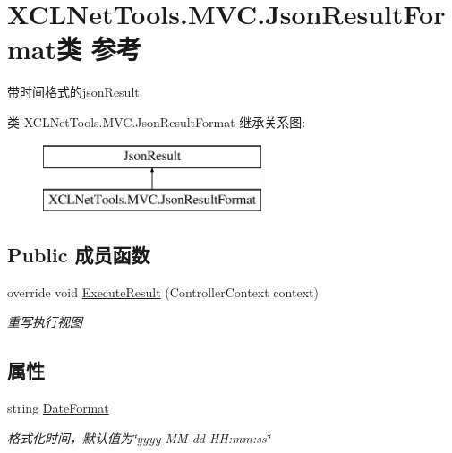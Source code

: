 \hypertarget{class_x_c_l_net_tools_1_1_m_v_c_1_1_json_result_format}{\section{X\-C\-L\-Net\-Tools.\-M\-V\-C.\-Json\-Result\-Format类 参考}
\label{class_x_c_l_net_tools_1_1_m_v_c_1_1_json_result_format}
}


带时间格式的json\-Result  


类 X\-C\-L\-Net\-Tools.\-M\-V\-C.\-Json\-Result\-Format 继承关系图\-:\begin{figure}[H]
\begin{center}
\leavevmode
\includegraphics[height=2.000000cm]{class_x_c_l_net_tools_1_1_m_v_c_1_1_json_result_format}
\end{center}
\end{figure}
\subsection*{Public 成员函数}
\begin{DoxyCompactItemize}
\item 
override void \hyperlink{class_x_c_l_net_tools_1_1_m_v_c_1_1_json_result_format_aa8f3283c42c9130afd1aa8990876f413}{Execute\-Result} (Controller\-Context context)
\begin{DoxyCompactList}\small\item\em 重写执行视图 \end{DoxyCompactList}\end{DoxyCompactItemize}
\subsection*{属性}
\begin{DoxyCompactItemize}
\item 
string \hyperlink{class_x_c_l_net_tools_1_1_m_v_c_1_1_json_result_format_afc01b7cf2cd3f17c481c25ad70fcd4f6}{Date\-Format}
\begin{DoxyCompactList}\small\item\em 格式化时间，默认值为\char`\"{}yyyy-\/\-M\-M-\/dd H\-H\-:mm\-:ss\char`\"{} \end{DoxyCompactList}\end{DoxyCompactItemize}



